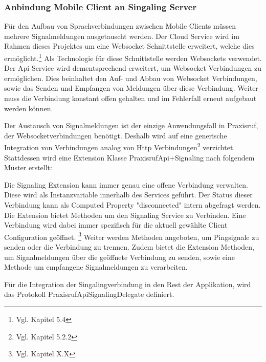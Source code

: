 \clearpage


\subsubsection{Anbindung Mobile Client an Singaling Server}

Für den Aufbau von Sprachverbindungen zwischen Mobile Clients müssen mehrere Signalmeldungen ausgetauscht werden.
Der Cloud Service wird im Rahmen dieses Projektes um eine Websocket Schnittstelle erweitert, welche dies ermöglicht.\footnote{Vgl. Kapitel 5.4}
Als Technologie für diese Schnittstelle werden Websockets verwendet.
Der Api Service wird dementsprechend erweitert, um Websocket Verbindungen zu ermöglichen.
Dies beinhaltet den Auf- und Abbau von Websocket Verbindungen, sowie das Senden und Empfangen von Meldungen über diese Verbindung.
Weiter muss die Verbindung konstant offen gehalten und im Fehlerfall erneut aufgebaut werden können.

Der Austausch von Signalmeldungen ist der einzige Anwendungsfall in Praxisruf, der Websocketverbindungen benötigt.
Deshalb wird auf eine generische Integration von Verbindungen analog von Http Verbindungen\footnote{Vgl. Kapitel 5.2.2} verzichtet.
Stattdessen wird eine Extension Klasse PraxisrufApi+Signaling nach folgendem Muster erstellt:



Die Signaling Extension kann immer genau eine offene Verbindung verwalten.
Diese wird als Instanzvariable innerhalb des Services geführt.
Der Status dieser Verbindung kann als Computed Property "disconnected" intern abgefragt werden.
Die Extension bietet Methoden um den Signaling Service zu Verbinden.
Eine Verbindung wird dabei immer spezifisch für die aktuell gewählte Client Configuration geöffnet. \footnote{Vgl. Kapitel X.X}
Weiter werden Methoden angeboten, um Pingsignale zu senden oder die Verbindung zu trennen.
Zudem bietet die Extension Methoden, um Signalmeldungen über die geöffnete Verbindung zu senden,
sowie eine Methode um empfangene Signalmeldungen zu verarbeiten.

Für die Integration der Singalingverbindung in den Rest der Applikation, wird das Protokoll PraxisrufApiSignalingDelegate definiert.



